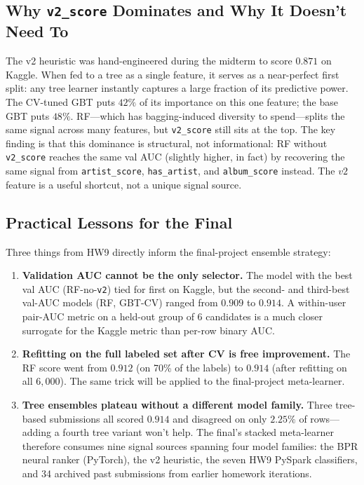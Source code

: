 \documentclass[12pt]{article}
\begin{document}
	\subsection{Why \texttt{v2\_score} Dominates and Why It Doesn't Need To}

	The v2 heuristic was hand-engineered during the midterm to score $0.871$ on Kaggle. When fed to a tree as a single feature, it serves as a near-perfect first split: any tree learner instantly captures a large fraction of its predictive power. The CV-tuned GBT puts $42\%$ of its importance on this one feature; the base GBT puts $48\%$. RF---which has bagging-induced diversity to spend---splits the same signal across many features, but \texttt{v2\_score} still sits at the top. The key finding is that this dominance is structural, not informational: RF without \texttt{v2\_score} reaches the same val AUC (slightly higher, in fact) by recovering the same signal from \texttt{artist\_score}, \texttt{has\_artist}, and \texttt{album\_score} instead. The $v2$ feature is a useful shortcut, not a unique signal source.

	\newpage
	\subsection{Practical Lessons for the Final}

	Three things from HW9 directly inform the final-project ensemble strategy:

	\begin{enumerate}
		\item \textbf{Validation AUC cannot be the only selector.} The model with the best val AUC (RF-no-\texttt{v2}) tied for first on Kaggle, but the second- and third-best val-AUC models (RF, GBT-CV) ranged from $0.909$ to $0.914$. A within-user pair-AUC metric on a held-out group of 6 candidates is a much closer surrogate for the Kaggle metric than per-row binary AUC.
		\item \textbf{Refitting on the full labeled set after CV is free improvement.} The RF score went from $0.912$ (on 70\% of the labels) to $0.914$ (after refitting on all $6{,}000$). The same trick will be applied to the final-project meta-learner.
		\item \textbf{Tree ensembles plateau without a different model family.} Three tree-based submissions all scored $0.914$ and disagreed on only $2.25\%$ of rows---adding a fourth tree variant won't help. The final's stacked meta-learner therefore consumes nine signal sources spanning four model families: the BPR neural ranker (PyTorch), the v2 heuristic, the seven HW9 PySpark classifiers, and 34 archived past submissions from earlier homework iterations.
	\end{enumerate}
\end{document}
